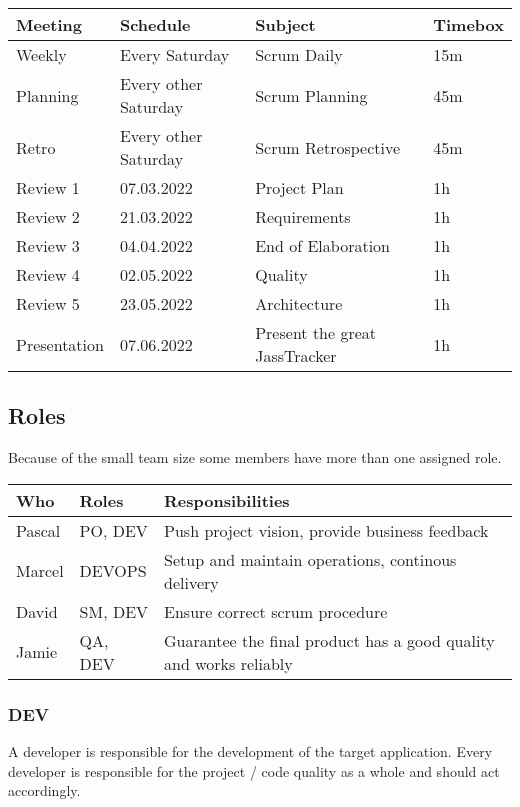 \begin{table}[H]
    \begin{tabular}{l|l|l|l}
    \textbf{Meeting} & \textbf{Schedule} & \textbf{Subject} & \textbf{Timebox} \\
    \hline
    Weekly & Every Saturday & Scrum Daily & 15m \\
    Planning & Every other Saturday & Scrum Planning & 45m \\
    Retro & Every other Saturday & Scrum Retrospective & 45m \\
    Review 1 & 07.03.2022 & Project Plan & 1h \\
    Review 2 & 21.03.2022 & Requirements & 1h \\
    Review 3 & 04.04.2022 & End of Elaboration & 1h \\
    Review 4 & 02.05.2022 & Quality & 1h \\
    Review 5 & 23.05.2022 & Architecture & 1h \\
    Presentation & 07.06.2022 & Present the great JassTracker & 1h
    \end{tabular}
\end{table}

\subsection*{Roles}

Because of the small team size some members have more than one assigned role.

\begin{table}[H]
    \begin{tabular}{l|l|l}
    \textbf{Who} & \textbf{Roles} & \textbf{Responsibilities} \\
    \hline
    Pascal & PO, DEV & Push project vision, provide business feedback \\
    Marcel & DEVOPS & Setup and maintain operations, continous delivery \\
    David  & SM, DEV & Ensure correct scrum procedure \\
    Jamie  & QA, DEV & Guarantee the final product has a good quality and works reliably
    \end{tabular}
\end{table}

\subsubsection*{DEV}
A developer is responsible for the development of the target application.
Every developer is responsible for the project / code quality as a whole and should act accordingly.

